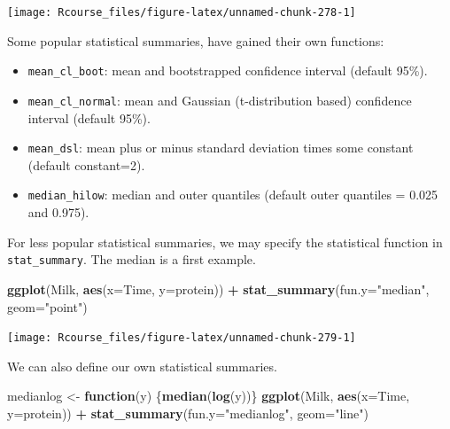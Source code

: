 \documentclass[]{book}
\newenvironment{Shaded}{\begin{snugshade}}{\end{snugshade}}
\newcommand{\KeywordTok}[1]{\textcolor[rgb]{0.13,0.29,0.53}{\textbf{#1}}}
\newcommand{\DataTypeTok}[1]{\textcolor[rgb]{0.13,0.29,0.53}{#1}}
\newcommand{\StringTok}[1]{\textcolor[rgb]{0.31,0.60,0.02}{#1}}
\newcommand{\ControlFlowTok}[1]{\textcolor[rgb]{0.13,0.29,0.53}{\textbf{#1}}}
\newcommand{\OperatorTok}[1]{\textcolor[rgb]{0.81,0.36,0.00}{\textbf{#1}}}
\newcommand{\NormalTok}[1]{#1}
\providecommand{\tightlist}{%
  \setlength{\itemsep}{0pt}\setlength{\parskip}{0pt}}
\theoremstyle{definition}
\theoremstyle{definition}
\theoremstyle{definition}
\theoremstyle{remark}
\begin{document}
\texttt{[image: Rcourse\_files/figure-latex/unnamed-chunk-278-1]}

Some popular statistical summaries, have gained their own functions:

\begin{itemize}
\tightlist
\item
  \texttt{mean\_cl\_boot}: mean and bootstrapped confidence interval
  (default 95\%).
\item
  \texttt{mean\_cl\_normal}: mean and Gaussian (t-distribution based)
  confidence interval (default 95\%).
\item
  \texttt{mean\_dsl}: mean plus or minus standard deviation times some
  constant (default constant=2).
\item
  \texttt{median\_hilow}: median and outer quantiles (default outer
  quantiles = 0.025 and 0.975).
\end{itemize}

For less popular statistical summaries, we may specify the statistical
function in \texttt{stat\_summary}. The median is a first example.

\begin{Shaded}
\begin{Highlighting}[]
\KeywordTok{ggplot}\NormalTok{(Milk, }\KeywordTok{aes}\NormalTok{(}\DataTypeTok{x=}\NormalTok{Time, }\DataTypeTok{y=}\NormalTok{protein)) }\OperatorTok{+}
\StringTok{  }\KeywordTok{stat_summary}\NormalTok{(}\DataTypeTok{fun.y=}\StringTok{"median"}\NormalTok{, }\DataTypeTok{geom=}\StringTok{"point"}\NormalTok{)}
\end{Highlighting}
\end{Shaded}

\texttt{[image: Rcourse\_files/figure-latex/unnamed-chunk-279-1]}

We can also define our own statistical summaries.

\begin{Shaded}
\begin{Highlighting}[]
\NormalTok{medianlog <-}\StringTok{ }\ControlFlowTok{function}\NormalTok{(y) \{}\KeywordTok{median}\NormalTok{(}\KeywordTok{log}\NormalTok{(y))\}}
\KeywordTok{ggplot}\NormalTok{(Milk, }\KeywordTok{aes}\NormalTok{(}\DataTypeTok{x=}\NormalTok{Time, }\DataTypeTok{y=}\NormalTok{protein)) }\OperatorTok{+}
\StringTok{  }\KeywordTok{stat_summary}\NormalTok{(}\DataTypeTok{fun.y=}\StringTok{"medianlog"}\NormalTok{, }\DataTypeTok{geom=}\StringTok{"line"}\NormalTok{)}
\end{Highlighting}
\end{Shaded}
\end{document}
